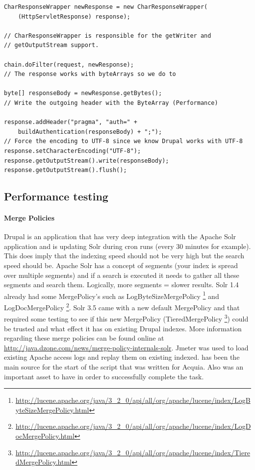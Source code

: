 \begin{verbatim}
CharResponseWrapper newResponse = new CharResponseWrapper(
    (HttpServletResponse) response);
    
// CharResponseWrapper is responsible for the getWriter and
// getOutputStream support.

chain.doFilter(request, newResponse);
// The response works with byteArrays so we do to

byte[] responseBody = newResponse.getBytes();
// Write the outgoing header with the ByteArray (Performance)

response.addHeader("pragma", "auth=" +
    buildAuthentication(responseBody) + ";");
// Force the encoding to UTF-8 since we know Drupal works with UTF-8
response.setCharacterEncoding("UTF-8");
response.getOutputStream().write(responseBody);
response.getOutputStream().flush();
\end{verbatim}
\caption{A snippet of the Acquia HMAC Filter for Solr 3.5. The buildAuthentication returns the value that is embedded in the HTTP headers so the client can verify the validity of the response.}

\subsection{Performance testing}
\paragraph{Merge Policies} Drupal is an application that has very deep integration with the Apache Solr application and is updating Solr during cron runs (every 30 minutes for example). This does imply that the indexing speed should not be very high but the search speed should be. Apache Solr has a concept of segments (your index is spread over multiple segments) and if a search is executed it needs to gather all these segments and search them. Logically, more segments = slower results.
Solr 1.4 already had some MergePolicy's such as LogByteSizeMergePolicy \footnote{\url{http://lucene.apache.org/java/3_2_0/api/all/org/apache/lucene/index/LogByteSizeMergePolicy.html}} and LogDocMergePolicy \footnote{\url{http://lucene.apache.org/java/3_2_0/api/all/org/apache/lucene/index/LogDocMergePolicy.html}}. 
Solr 3.5 came with a new default MergePolicy and that required some testing to see if this new MergePolicy (TieredMergePolicy \footnote{\url{http://lucene.apache.org/java/3_2_0/api/all/org/apache/lucene/index/TieredMergePolicy.html}}) could be trusted and what effect it has on existing Drupal indexes.
More information regarding these merge policies can be found online at \url{http://java.dzone.com/news/merge-policy-internals-solr}.
Jmeter was used to load existing Apache access logs and replay them on existing indexed. \cite{accesslogs}  has been the main source for the start of the script that was written for Acquia. Also \cite{jmeterplayback} was an important asset to have in order to successfully complete the task.

